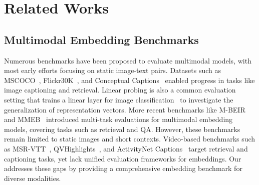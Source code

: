 \section{Related Works}
\subsection{Multimodal Embedding Benchmarks}
Numerous benchmarks have been proposed to evaluate multimodal models, with most early efforts focusing on static image-text pairs. Datasets such as MSCOCO~\citep{mscoco}, Flickr30K~\citep{flickr30k}, and Conceptual Captions~\citep{ccdataset} enabled progress in tasks like image captioning and retrieval. Linear probing is also a common evaluation setting that trains a linear layer for image classification~\citep{clip} to investigate the generalization of representation vectors. More recent benchmarks like M-BEIR~\citep{uniir} and MMEB~\citep{vlm2vec} introduced multi-task evaluations for multimodal embedding models, covering tasks such as retrieval and QA. However, these benchmarks remain limited to static images and short contexts. Video-based benchmarks such as MSR-VTT~\citep{msrvtt}, QVHighlights~\citep{qvhighlights}, and ActivityNet Captions~\citep{activitynet} target retrieval and captioning tasks, yet lack unified evaluation frameworks for embeddings. Our \benchmark addresses these gaps by providing a comprehensive embedding benchmark for diverse modalities.


